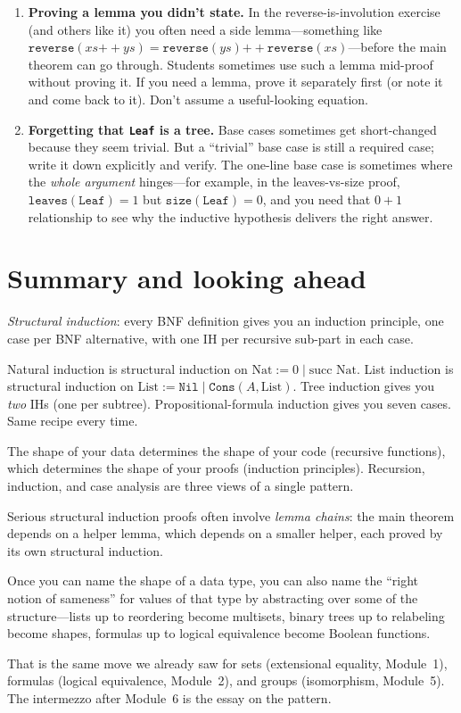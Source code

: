 \documentclass[11pt]{article}
\begin{document}
\begin{enumerate}
  \item \textbf{Proving a lemma you didn't state.} In the reverse-is-involution exercise (and others like it) you often need a side lemma---something like $\texttt{reverse}(xs \mathbin{++} ys) = \texttt{reverse}(ys) \mathbin{++} \texttt{reverse}(xs)$---before the main theorem can go through. Students sometimes use such a lemma mid-proof without proving it. If you need a lemma, prove it separately first (or note it and come back to it). Don't assume a useful-looking equation.
  \item \textbf{Forgetting that \texttt{Leaf} is a tree.} Base cases sometimes get short-changed because they seem trivial. But a ``trivial'' base case is still a required case; write it down explicitly and verify. The one-line base case is sometimes where the \emph{whole argument} hinges---for example, in the leaves-vs-size proof, $\texttt{leaves}(\texttt{Leaf}) = 1$ but $\texttt{size}(\texttt{Leaf}) = 0$, and you need that $0 + 1$ relationship to see why the inductive hypothesis delivers the right answer.
\end{enumerate}

\section{Summary and looking ahead}

\begin{keytakeaway}
  \item \emph{Structural induction}: every BNF definition gives you an induction principle, one case per BNF alternative, with one IH per recursive sub-part in each case.
  \item Natural induction is structural induction on $\text{Nat} := 0 \mid \text{succ Nat}$. List induction is structural induction on $\text{List} := \texttt{Nil} \mid \texttt{Cons}(A, \text{List})$. Tree induction gives you \emph{two} IHs (one per subtree). Propositional-formula induction gives you seven cases. Same recipe every time.
  \item The shape of your data determines the shape of your code (recursive functions), which determines the shape of your proofs (induction principles). Recursion, induction, and case analysis are three views of a single pattern.
  \item Serious structural induction proofs often involve \emph{lemma chains}: the main theorem depends on a helper lemma, which depends on a smaller helper, each proved by its own structural induction.
  \item Once you can name the shape of a data type, you can also name the ``right notion of sameness'' for values of that type by abstracting over some of the structure---lists up to reordering become multisets, binary trees up to relabeling become shapes, formulas up to logical equivalence become Boolean functions.
  \item That is the same move we already saw for sets (extensional equality, Module~1), formulas (logical equivalence, Module~2), and groups (isomorphism, Module~5). The intermezzo after Module~6 is the essay on the pattern.
\end{keytakeaway}
\end{document}
